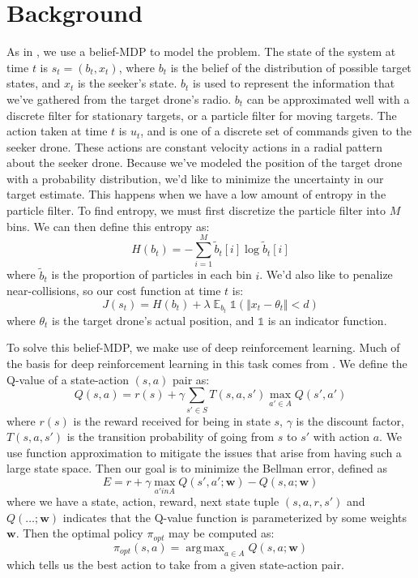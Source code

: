 \documentclass{article}
\DeclareMathOperator*{\argmax}{arg\,max}
\begin{document}
\section{Background}
As in \cite{dronehunter}, we use a belief-MDP to model the problem.
The state of the system at time $t$ is $s_t = (b_t, x_t)$, where $b_t$ is the belief of the distribution of possible target states, and $x_t$ is the seeker's state.
$b_t$ is used to represent the information that we've gathered from the target drone's radio.
$b_t$ can be approximated well with a discrete filter for stationary targets, or a particle filter for moving targets.
The action taken at time $t$ is $u_t$, and is one of a discrete set of commands given to the seeker drone.
These actions are constant velocity actions in a radial pattern about the seeker drone.
Because we've modeled the position of the target drone with a probability distribution, we'd like to minimize the uncertainty in our target estimate.
This happens when we have a low amount of entropy in the particle filter.
To find entropy, we must first discretize the particle filter into $M$ bins.
We can then define this entropy as:
\begin{equation}
H(b_t) = -\sum_{i = 1}^M\tilde{b}_t[i]\log\tilde{b}_t[i]
\end{equation}
where $\tilde{b}_t$ is the proportion of particles in each bin $i$.
We'd also like to penalize near-collisions, so our cost function at time $t$ is:
\begin{equation}
J(s_t) = H(b_t) + \lambda\mathop{{}\mathbb{E}}_{b_t} \mathds{1} (\Vert x_t - \theta_t\Vert < d)
\end{equation}
where  $\theta_t$ is the target drone's actual position, and $\mathds{1}$ is an indicator function.

To solve this belief-MDP, we make use of deep reinforcement learning.
Much of the basis for deep reinforcement learning in this task comes from \cite{kyle}.
We define the Q-value of a state-action $(s, a)$ pair as:
\begin{equation}
Q(s, a) = r(s) + \gamma\sum_{s' \in S}T(s, a, s')\max_{a' \in A}Q(s', a')
\end{equation}
where $r(s)$ is the reward received for being in state $s$, $\gamma$ is the discount factor, $T(s, a, s')$ is the transition probability of going from $s$ to $s'$ with action $a$.
We use function approximation to mitigate the issues that arise from having such a large state space.
Then our goal is to minimize the Bellman error, defined as
\begin{equation}
E = r + \gamma\max_{a' in A}Q(s', a'; \mathbf{w}) - Q(s, a; \mathbf{w})
\end{equation}
where we have a state, action, reward, next state tuple $(s, a, r, s')$ and $Q(\dots; \mathbf{w})$ indicates that the Q-value function is parameterized by some weights $\mathbf{w}$.
Then the optimal policy $\pi_{opt}$ may be computed as:
\begin{equation}
\pi_{opt}(s, a) = \argmax_{a \in A}Q(s, a; \mathbf{w})
\end{equation}
which tells us the best action to take from a given state-action pair.
\end{document}
